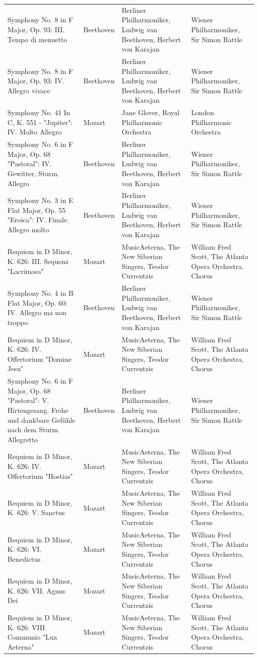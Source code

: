 \begin{longtable}{p{} p{} p{} p{}}
Symphony No. 8 in F Major, Op. 93: III. Tempo di menuetto & Beethoven & Berliner Philharmoniker, Ludwig van Beethoven, Herbert von Karajan & Wiener Philharmoniker, Sir Simon Rattle \\
Symphony No. 8 in F Major, Op. 93: IV. Allegro vivace & Beethoven & Berliner Philharmoniker, Ludwig van Beethoven, Herbert von Karajan & Wiener Philharmoniker, Sir Simon Rattle \\
Symphony No. 41 In C, K. 551 - "Jupiter": IV. Molto Allegro & Mozart & Jane Glover, Royal Philharmonic Orchestra & London Philharmonic Orchestra \\
Symphony No. 6 in F Major, Op. 68 "Pastoral": IV. Gewitter, Sturm. Allegro & Beethoven & Berliner Philharmoniker, Ludwig van Beethoven, Herbert von Karajan & Wiener Philharmoniker, Sir Simon Rattle \\
Symphony No. 3 in E Flat Major, Op. 55 "Eroica": IV. Finale. Allegro molto & Beethoven & Berliner Philharmoniker, Ludwig van Beethoven, Herbert von Karajan & Wiener Philharmoniker, Sir Simon Rattle \\
Requiem in D Minor, K. 626: III. Sequenz "Lacrimosa" & Mozart & MusicAeterna, The New Siberian Singers, Teodor Currentzis & William Fred Scott, The Atlanta Opera Orchestra, Chorus \\
Symphony No. 4 in B Flat Major, Op. 60: IV. Allegro ma non troppo & Beethoven & Berliner Philharmoniker, Ludwig van Beethoven, Herbert von Karajan & Wiener Philharmoniker, Sir Simon Rattle \\
Requiem in D Minor, K. 626: IV. Offertorium "Domine Jesu" & Mozart & MusicAeterna, The New Siberian Singers, Teodor Currentzis & William Fred Scott, The Atlanta Opera Orchestra, Chorus \\
Symphony No. 6 in F Major, Op. 68 "Pastoral": V. Hirtengesang. Frohe und dankbare Gefühle nach dem Sturm. Allegretto & Beethoven & Berliner Philharmoniker, Ludwig van Beethoven, Herbert von Karajan & Wiener Philharmoniker, Sir Simon Rattle \\
Requiem in D Minor, K. 626: IV. Offertorium "Hostias" & Mozart & MusicAeterna, The New Siberian Singers, Teodor Currentzis & William Fred Scott, The Atlanta Opera Orchestra, Chorus \\
Requiem in D Minor, K. 626: V. Sanctus & Mozart & MusicAeterna, The New Siberian Singers, Teodor Currentzis & William Fred Scott, The Atlanta Opera Orchestra, Chorus \\
Requiem in D Minor, K. 626: VI. Benedictus & Mozart & MusicAeterna, The New Siberian Singers, Teodor Currentzis & William Fred Scott, The Atlanta Opera Orchestra, Chorus \\
Requiem in D Minor, K. 626: VII. Agnus Dei & Mozart & MusicAeterna, The New Siberian Singers, Teodor Currentzis & William Fred Scott, The Atlanta Opera Orchestra, Chorus \\
Requiem in D Minor, K. 626: VIII. Communio "Lux Aeterna" & Mozart & MusicAeterna, The New Siberian Singers, Teodor Currentzis & William Fred Scott, The Atlanta Opera Orchestra, Chorus \\

\end{longtable}

